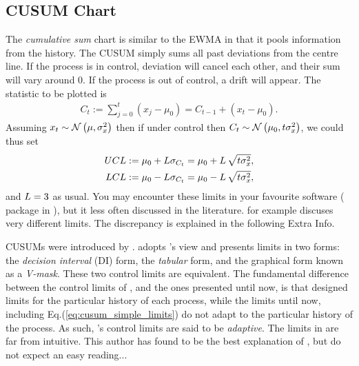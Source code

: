 \subsection[CUSUM]{CUSUM Chart}
The \emph{cumulative sum} chart is similar to the EWMA in that it pools information from the history. 
The CUSUM simply sums all past deviations from the centre line.
If the process is in control, deviation will cancel each other, and their sum will vary around $0$. 
If the process is out of control, a drift will appear. 
The statistic to be plotted is 
\begin{align}
	C_t:= \sum_{j=0}^{t}(x_j-\mu_0) = C_{t-1}+ (x_t-\mu_0).
\end{align} 
Assuming $x_t \sim \mathcal{N}\left(\mu, \sigma_x^2\right)$ then if under control then $C_t \sim \mathcal{N}\left(\mu_0, t \sigma_x^2\right)$, we could thus set 
\begin{align}
\label{eq:cusum_simple_limits}
\begin{split}
	UCL &:= \mu_0 + L \sigma_{C_t}= \mu_0 + L \, \sqrt{t \sigma_x^2},  \\
	LCL &:= \mu_0 - L \sigma_{C_t}= \mu_0 - L \, \sqrt{t \sigma_x^2},
\end{split}
\end{align}
and $L=3$ as usual. 
You may encounter these limits in your favourite software ( package in \R), but it less often discussed in the literature. \cite{montgomery_introduction_2007} for example discuses very different limits. The discrepancy is explained in the following Extra Info. 

\begin{extra}
CUSUMs were introduced by \cite{page_continuous_1954}. 
\cite{montgomery_introduction_2007} adopts \citeauthor{page_continuous_1954}'s view and presents limits in two forms: the \emph{decision interval} (DI) form, \aka the \emph{tabular} form, and the graphical form known as a \emph{V-mask}.
These two control limits are equivalent. 
The fundamental difference between the control limits of \cite{page_continuous_1954}, and the ones presented until now, is that \citeauthor{page_continuous_1954} designed limits for the particular history of each process, while the limits until now, including Eq.(\ref{eq:cusum_simple_limits}) do not adapt to the particular history of the process.
As such, \citeauthor{page_continuous_1954}'s control limits are said to be \emph{adaptive}.
The limits in \cite{page_continuous_1954} are far from intuitive. 
This author has found \cite{ritov_decision_1990} to be the best explanation of \cite{page_continuous_1954}, but do not expect an easy reading...
\end{extra}









